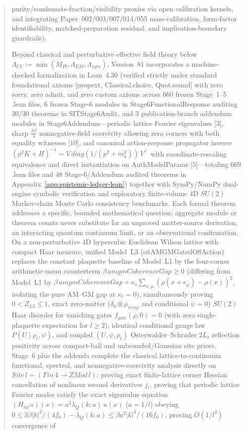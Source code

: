 \documentclass[american,11pt,letterpaper]{article}
\def\mathrm#1{#1}%
\def\texttt#1{#1}%
\def\emph#1{#1}%
\begin{document}
\begin{abstract}
purity/condensate-fraction/visibility proxies via open calibration kernels, and integrating Paper~002/003/007/014/055 mass-calibration, form-factor identifiability, matched-preparation residual, and implication-boundary guardrails).

Beyond classical and perturbative effective field theory below $\Lambda_{\mathrm{UV}} := \min(M_{\mathrm{Pl}}, \Lambda_{\mathrm{EM}}, \Lambda_{\mathrm{sym}})$, Version~81 incorporates a machine-checked formalization in Lean~4.30 (verified strictly under standard foundational axioms \texttt{[propext, Classical.\allowbreak{}choice, Quot.\allowbreak{}sound]} with zero \texttt{sorry}, zero \texttt{admit}, and zero custom axioms across $660$ frozen Stage~1--5 \texttt{.lean} files, $6$ frozen Stage-6 modules in \texttt{Stage6FunctionalResponse} auditing $30/30$ theorems in \texttt{SITStage6Audit}, and $3$ publication-branch addendum modules in \texttt{Stage6Addendum}---periodic lattice Fourier eigenvalues [$3$], sharp $\frac{3\beta}{4}$ nonnegative-field coercivity allowing zero corners with both equality witnesses [$10$], and canonical action-response propagator inverse $(p^2 K + H)^{-1} = V\,\mathrm{diag}(1/(p^2+m_a^2))\,V^\top$ with coordinate-rescaling equivalence and direct instantiation on \texttt{AuthModelParams} [$5$]---totaling $669$ \texttt{.lean} files and $48$ Stage-6/Addendum audited theorems in Appendix~\ref{app:epistemic-ledger-lean}) together with SymPy/NumPy dual-engine symbolic verification and exploratory finite-volume 4D $SU(2)$ Markov-chain Monte Carlo consistency benchmarks. Each formal theorem addresses a specific, bounded mathematical question; aggregate module or theorem counts never substitute for an unproved matter-source derivation, an interacting quantum continuum limit, or an observational confirmation. On a non-perturbative 4D hypercubic Euclidean Wilson lattice with compact Haar measure, unified Model~L3 (\texttt{sitAMGMGatedOSAction}) replaces the constant plaquette baseline of Model~L1 by the four-corner arithmetic-mean counterterm $\beta\,\mathrm{amgmCoherenceGap} \ge 0$ (differing from Model~L1 by $\beta\,\mathrm{amgmCoherenceGap} + \kappa_t\sum_{x,\mu}(\rho(x+e_\mu)-\rho(x))^2$, isolating the pure AM--GM gap at $\kappa_t = 0$), simultaneously proving $0 < Z_{\mathrm{L3}} \le 1$, exact zero-matter ($\delta_0 \otimes \mu_{\mathrm{temp}}$ and conditional $\psi = 0$) $SU(2)$ Haar disorder for vanishing gates $f_{\mathrm{gate}}(\rho,0) = 0$ (with zero single-plaquette expectation for $l \ge 2$), identical conditional gauge law $P(U \mid \rho_t,\psi)$, and coupled $(U,\psi,\rho_t)$ Osterwalder--Schrader $2L_t$ reflection positivity across compact-ball and unbounded/Gaussian site priors. Stage~6 plus the addenda complete the \emph{classical} lattice-to-continuum functional, spectral, and nonnegative-coercivity analysis directly on $\mathrm{Site}\,l = (\mathrm{Fin}\,4 \to \mathrm{ZMod}\,l)$: proving exact finite-lattice corner Hessian cancellation of nonlinear second derivatives $j_i$, proving that periodic lattice Fourier modes satisfy the exact eigenvalue equation $(H_{\mathrm{lat}} u)(x) = a^2\lambda_Q(k;a)\,u(x)$ ($a = 1/l$) obeying $0 \le 3\beta|k|^2/(4f_0) - \lambda_Q(k;a) \le \beta a^2|k|^4/(16f_0)$, proving $O(1/l^2)$ convergence of 
\end{abstract}
\end{document}
